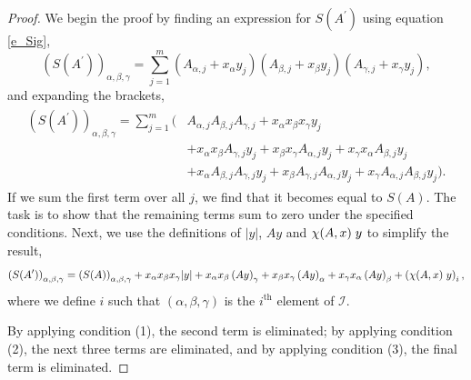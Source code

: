 \documentclass{article}
\theoremstyle{definition}
\theoremstyle{problem}
\theoremstyle{lemma}
\begin{document}
		\begin{proof}
			We begin the proof by finding an expression for $S(A^\prime)$ using equation \ref{e_Sig},
			\begin{equation}
			\left(S(A^\prime)\right)_{\alpha,\beta,\gamma} = \sum_{j=1}^{m}\left(A_{\alpha,j}+x_\alpha y_j\right)\left(A_{\beta,j}+x_\beta y_j\right)\left(A_{\gamma,j}+x_\gamma y_j\right),
			\end{equation}
			and expanding the brackets,
			\begin{align}
			\label{e_working1}
			\begin{split}
			\left(S(A^\prime)\right)_{\alpha,\beta,\gamma} = \sum_{j=1}^{m}(&A_{\alpha,j}A_{\beta,j}A_{\gamma,j} + x_\alpha x_\beta x_\gamma y_j  \\			
			&+ x_\alpha x_\beta A_{\gamma,j} y_j + x_\beta x_\gamma A_{\alpha,j} y_j + x_\gamma x_\alpha A_{\beta,j} y_j \\
			&+ x_\alpha A_{\beta,j} A_{\gamma,j} y_j + x_\beta A_{\gamma,j} A_{\alpha,j} y_j + x_\gamma A_{\alpha,j} A_{\beta,j} y_j).
			\end{split}
			\end{align}
			If we sum the first term over all $j$, we find that it becomes equal to $S(A)$. The task is to show that the remaining terms sum to zero under the specified conditions. Next, we use the definitions of $|y|$, $Ay$ and $\chi(A,x)\hspace{1mm}y$ to simplify the result,
			\begin{equation}
			\left(S(A^\prime)\right)_{\alpha,\beta,\gamma} = \left(S(A)\right)_{\alpha,\beta,\gamma} + x_\alpha x_\beta x_\gamma |y| + x_\alpha x_\beta \left(Ay\right)_\gamma + x_\beta x_\gamma \left(Ay\right)_\alpha + x_\gamma x_\alpha \left(Ay\right)_\beta + \left(\chi(A,x)\hspace{1mm}y\right)_i,
			\end{equation}
			where we define $i$ such that $(\alpha,\beta,\gamma)$ is the $i^\text{th}$ element of $\mathcal{I}$.
			
			By applying condition (1), the second term is eliminated; by applying condition (2), the next three terms are eliminated, and by applying condition (3), the final term is eliminated.
		\end{proof}
	
\end{document}
